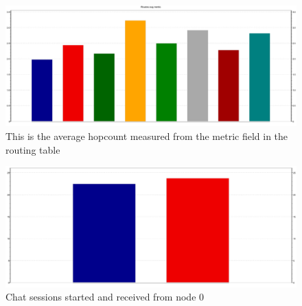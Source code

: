 \documentclass[12pt, a4]{article}
\theoremstyle{definition}
\begin{document}
\begin{figure}
\begin{center}
\includegraphics[scale=0.35, angle=90]{images/AdHocLittleAreaFastSquaredHc}
\caption{This is the average hopcount measured from the metric field in the
routing table}
\end{center}
\end{figure}

\begin{figure}
\begin{center}
\includegraphics[scale=0.35]{images/AdHocLittleAreaFastSquaredChat}
\caption{Chat sessions started and received from node 0}
\end{center}
\end{figure}





%
\end{document}
